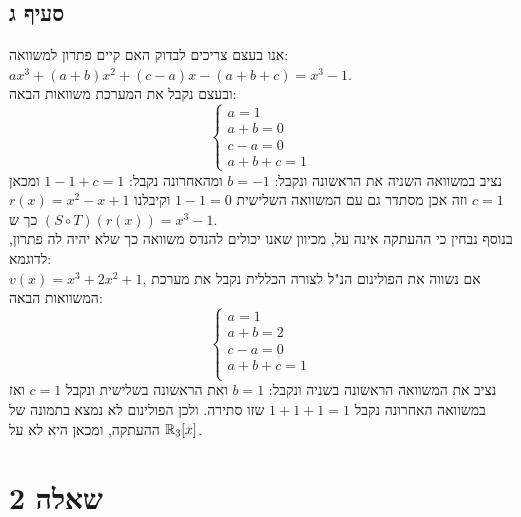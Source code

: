 \documentclass{article}
\begin{document}
	\subsection*{סעיף ג}
	אנו בעצם צריכים לבדוק האם קיים פתרון למשוואה: \\
	$ax^3 + (a + b)x^2 + (c-a)x - (a+b+c) = x^3 - 1$. \\
	ובעצם נקבל את המערכת משוואות הבאה:
	\[
	\begin{cases}
		a = 1 \\
		a + b = 0 \\
		c - a = 0 \\
		a + b + c = 1
	\end{cases}
	\]
	נציב במשוואה השניה את הראשונה ונקבל: $b = -1$ ומהאחרונה נקבל: $1 - 1 + c = 1$ ומכאן $c = 1$ וזה אכן מסתדר גם עם המשוואה השלישית $1-1=0$
	וקיבלנו $r(x) = x^2 - x + 1$ כך ש $(S \circ T)(r(x)) = x^3 - 1$. \\
	בנוסף נבחין כי ההעתקה אינה על, מכיוון שאנו יכולים להנדס משוואה כך שלא יהיה לה פתרון, לדוגמא: \\
	$v(x) = x^3 + 2x^2 + 1$, אם נשווה את הפולינום הנ"ל לצורה הכללית נקבל את מערכת המשוואות הבאה:
	\[
	\begin{cases}
		a = 1 \\
		a + b = 2 \\
		c - a = 0 \\
		a + b + c = 1 \\
	\end{cases}
	\]
	נציב את המשוואה הראשונה בשניה ונקבל: $b = 1$ ואת הראשונה בשלישית ונקבל $c = 1$ ואז במשוואה האחרונה נקבל $1 + 1 + 1 = 1$ שזו סתירה. ולכן הפולינום לא נמצא בתמונה של ההעתקה, ומכאן היא לא על $\mathbb{R}_3[x]$.

	\pagebreak

	\section*{שאלה 2}
\end{document}
